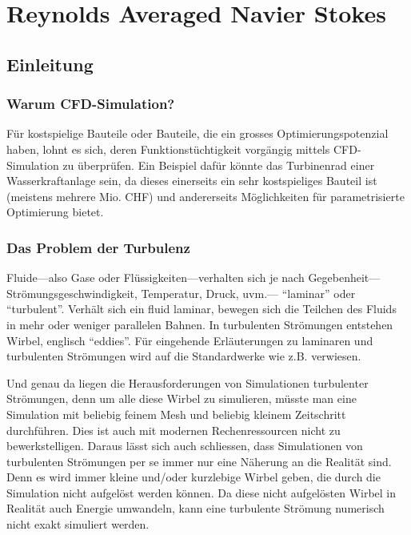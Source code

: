 %
%
%
%
\chapter{Reynolds Averaged Navier Stokes \label{chapter:reynolds}}
\begin{refsection}
%
%
%
%

\section{Einleitung}

\subsection{Warum CFD-Simulation?}

Für kostspielige Bauteile oder Bauteile, die ein grosses Optimierungspotenzial haben,
lohnt es sich, deren Funktionstüchtigkeit vorgängig mittels CFD-Simulation zu überprüfen.
Ein Beispiel dafür könnte das Turbinenrad einer Wasserkraftanlage sein,
da dieses einerseits ein sehr kostspieliges Bauteil ist (meistens mehrere Mio. CHF)
und andererseits Möglichkeiten für parametrisierte Optimierung bietet.

\subsection{Das Problem der Turbulenz}

Fluide---also Gase oder Flüssigkeiten---verhalten sich je nach Gegebenheit---Strömungs\-ge\-schwindigkeit, Temperatur, Druck, uvm.---
``laminar'' oder ``turbulent''. Verhält sich ein fluid laminar, bewegen sich die Teilchen des Fluids in mehr oder weniger
parallelen Bahnen. In turbulenten Strömungen entstehen Wirbel, englisch ``eddies''. Für eingehende Erläuterungen zu laminaren
und turbulenten Strömungen wird auf die Standardwerke wie z.B. \cite{reynolds:oertel} verwiesen.

Und genau da liegen die Herausforderungen von Simulationen turbulenter Strömungen,
denn um alle diese Wirbel zu simulieren, müsste man eine Simulation mit beliebig feinem Mesh und beliebig kleinem Zeitschritt durchführen.
Dies ist auch mit modernen Rechenressourcen nicht zu bewerkstelligen.
Daraus lässt sich auch schliessen, dass Simulationen von turbulenten Strömungen per se immer nur eine Näherung an die Realität sind.
Denn es wird immer kleine und/oder kurzlebige Wirbel geben, die durch die Simulation nicht aufgelöst werden können.
Da diese nicht aufgelösten Wirbel in Realität auch Energie umwandeln, kann eine turbulente Strömung numerisch nicht exakt simuliert werden.



\end{refsection}

